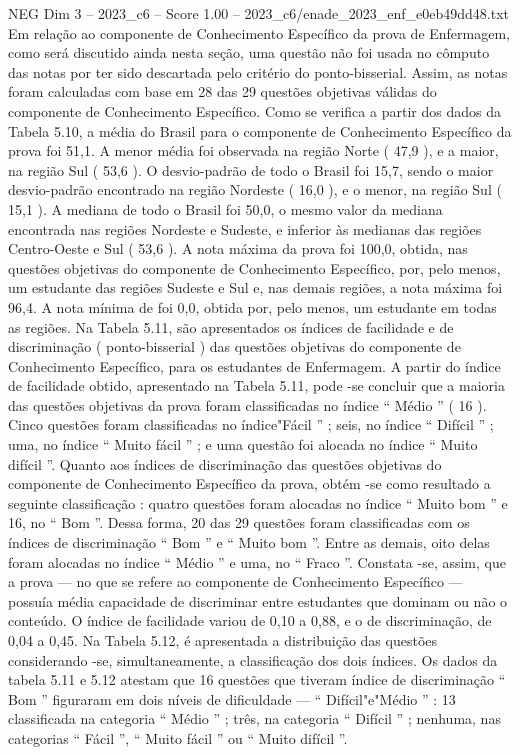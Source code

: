 \begin{textsample}{NEG Dim 3 – 2023\_c6 – Score 1.00 – 2023\_c6/enade\_2023\_enf\_e0eb49dd48.txt}
Em relação ao componente de Conhecimento Específico da prova de Enfermagem, como será discutido ainda nesta seção, uma questão não foi usada no cômputo das notas por ter sido descartada pelo critério do ponto-bisserial.
Assim, as notas foram calculadas com base em 28 das 29 questões objetivas válidas do componente de Conhecimento Específico.
Como se verifica a partir dos dados da Tabela 5.10, a média do Brasil para o componente de Conhecimento Específico da prova foi 51,1.
A menor média foi observada na região Norte ( 47,9 ), e a maior, na região Sul ( 53,6 ).
O desvio-padrão de todo o Brasil foi 15,7, sendo o maior desvio-padrão encontrado na região Nordeste ( 16,0 ), e o menor, na região Sul ( 15,1 ).
A mediana de todo o Brasil foi 50,0, o mesmo valor da mediana encontrada nas regiões Nordeste e Sudeste, e inferior às medianas das regiões Centro-Oeste e Sul ( 53,6 ).
A nota máxima da prova foi 100,0, obtida, nas questões objetivas do componente de Conhecimento Específico, por, pelo menos, um estudante das regiões Sudeste e Sul e, nas demais regiões, a nota máxima foi 96,4.
A nota mínima de foi 0,0, obtida por, pelo menos, um estudante em todas as regiões.
Na Tabela 5.11, são apresentados os índices de facilidade e de discriminação ( ponto-bisserial ) das questões objetivas do componente de Conhecimento Específico, para os estudantes de Enfermagem.
A partir do índice de facilidade obtido, apresentado na Tabela 5.11, pode -se concluir que a maioria das questões objetivas da prova foram classificadas no índice “ Médio ” ( 16 ).
Cinco questões foram classificadas no índice"Fácil ” ; seis, no índice “ Difícil ” ; uma, no índice “ Muito fácil ” ; e uma questão foi alocada no índice “ Muito difícil ”.
Quanto aos índices de discriminação das questões objetivas do componente de Conhecimento Específico da prova, obtém -se como resultado a seguinte classificação : quatro questões foram alocadas no índice “ Muito bom ” e 16, no “ Bom ”.
Dessa forma, 20 das 29 questões foram classificadas com os índices de discriminação “ Bom ” e “ Muito bom ”.
Entre as demais, oito delas foram alocadas no índice “ Médio ” e uma, no “ Fraco ”.
Constata -se, assim, que a prova — no que se refere ao componente de Conhecimento Específico — possuía média capacidade de discriminar entre estudantes que dominam ou não o conteúdo.
O índice de facilidade variou de 0,10 a 0,88, e o de discriminação, de 0,04 a 0,45.
Na Tabela 5.12, é apresentada a distribuição das questões considerando -se, simultaneamente, a classificação dos dois índices.
Os dados da tabela 5.11 e 5.12 atestam que 16 questões que tiveram índice de discriminação “ Bom ” figuraram em dois níveis de dificuldade — “ Difícil"e"Médio ” : 13 classificada na categoria “ Médio ” ; três, na categoria “ Difícil ” ; nenhuma, nas categorias “ Fácil ”, “ Muito fácil ” ou “ Muito difícil ”.

\end{textsample}
